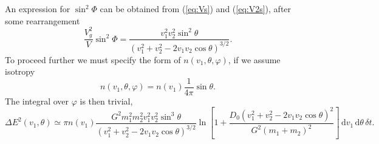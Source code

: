 \documentclass[useAMS,usedcolumn,usegraphicx,usenatbib]{mn2e}
\newcommand{\eqnref}[1]{(\ref{eq:#1})}
\newcommand{\dd}{\ensuremath{\mathrm{d}}}
\newcommand{\recip}[1]{\ensuremath{\dfrac{1}{#1}}}
\begin{document}
\begin{onecolumn}
An expression for $\sin^2\Phi$ can be obtained from \eqnref{Vs} and \eqnref{V2s}, after some rearrangement
\begin{equation}
\frac{V_g^2}{V}\sin^2\Phi = \frac{v_1^2v_2^2\sin^2\theta}{\left(v_1^2 + v_2^2 - 2v_1 v_2 \cos\theta\right)^{3/2}}.
\end{equation}
To proceed further we must specify the form of $n(v_1,\theta,\varphi)$, if we assume isotropy
\begin{equation}
n(v_1,\theta,\varphi) = n(v_1)\recip{4\pi}\sin\theta.
\end{equation}
The integral over $\varphi$ is then trivial,
\begin{equation}
\Delta E^2(v_1,\theta) \simeq \pi n(v_1)\frac{G^2m_1^2 m_2^2v_1^2v_2^2\sin^3\theta}{\left(v_1^2 + v_2^2 - 2v_1 v_2 \cos\theta\right)^{3/2}}\ln\left[1 + \frac{D_0\left(v_1^2 + v_2^2 - 2v_1 v_2 \cos\theta\right)^2}{G^2\left(m_1 + m_2\right)^2}\right]\,\dd v_1\,\dd\theta\,\delta t.
\end{equation}


\end{onecolumn}
\end{document}

